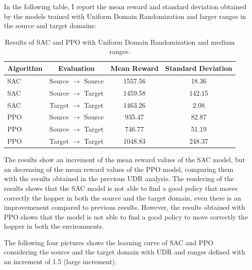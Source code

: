\documentclass[12pt]{article}
\begin{document}
In the following table, I report the mean reward and standard deviation obtained by the models trained with Uniform Domain Randomization and larger ranges in the source and target domains:

\begin{table}[H]
    \centering
    \begin{tabular}{|l|c|c|c|}
        \hline
        \textbf{Algorithm} & \textbf{Evaluation} & \textbf{Mean Reward} & \textbf{Standard Deviation} \\ \hline
        SAC & Source $\rightarrow$ Source & 1557.56 & 18.36 \\ 
        SAC & Source $\rightarrow$ Target & 1459.58 & 142.15 \\ 
        SAC & Target $\rightarrow$ Target & 1463.26 & 2.08 \\ \hline
        PPO & Source $\rightarrow$ Source & 935.47 & 82.87 \\ 
        PPO & Source $\rightarrow$ Target & 746.77 & 51.19 \\ 
        PPO & Target $\rightarrow$ Target & 1048.83 & 248.37 \\ \hline
    \end{tabular}
    \caption{Results of SAC and PPO with Uniform Domain Randomization and medium ranges.}
    \label{tab:results_udr_larger}
\end{table}

The results show an increment of the mean reward values of the SAC model, but an decreasing of the mean reward values of the PPO model, comparing them with the results obtained in the previous UDR analysis. The rendering of the results shows that the SAC model is not able to find a good policy that moves correctly the hopper in both the source and the target domain, even there is an improvemenent compared to previous results. However, the results obtained with PPO shows that the model is not able to find a good policy to move correctly the hopper in both the environments. 

The following four pictures shows the learning curve of SAC and PPO considering the source and the target domain with UDR and ranges defined with an increment of 1.5 (large increment).
\end{document}
